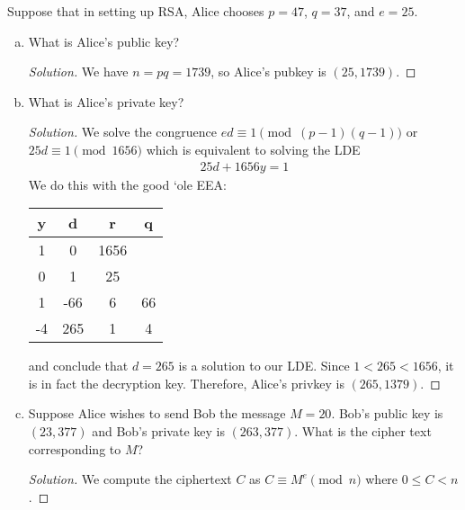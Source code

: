 \documentclass{agony}
\begin{document}
\question Suppose that in setting up RSA, Alice chooses $p = 47$, $q = 37$, and $e = 25$.
\begin{enumerate}[(a)]
  \item What is Alice's public key?
        \begin{proof}[Solution]
          We have $n = pq = 1739$, so Alice's pubkey is $(25, 1739)$.
        \end{proof}
  \item What is Alice's private key?
        \begin{proof}[Solution]
          We solve the congruence $ed \equiv 1 \pmod{(p-1)(q-1)}$ or $25d \equiv 1 \pmod{1656}$
          which is equivalent to solving the LDE
          \begin{align*}
            25d + 1656y = 1
          \end{align*}
          We do this with the good `ole EEA\@:
          \begin{center}
            \begin{tabular}{C|C|C|C}
              y  & d   & r    & q  \\   & 0   & 1656      \\
              0  & 1   & 25        \\
              1  & -66 & 6    & 66 \\
              -4 & 265 & 1    & 4
            \end{tabular}
          \end{center}
          and conclude that $d=265$ is a solution to our LDE\@.
          Since $1 < 265 < 1656$, it is in fact the decryption key.
          Therefore, Alice's privkey is $(265,1379)$.
        \end{proof}
  \item Suppose Alice wishes to send Bob the message $M = 20$.
        Bob's public key is $(23, 377)$ and Bob’s private key is $(263, 377)$.
        What is the cipher text corresponding to $M$?
        \begin{proof}[Solution]
          We compute the ciphertext $C$ as $C \equiv M^e \pmod{n}$ where $0 \leq C < n$.


\end{proof}
\end{enumerate}
\end{document}
